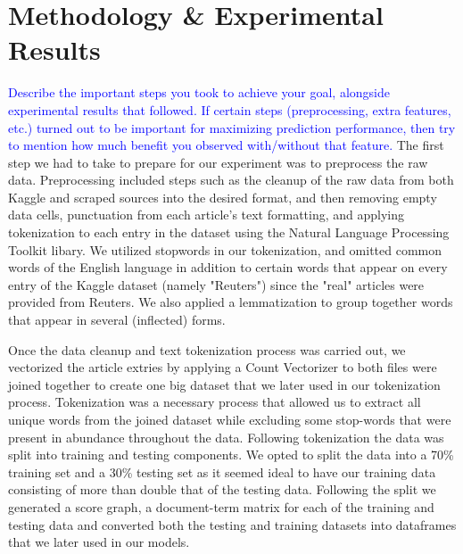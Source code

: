 \documentclass[10pt,twocolumn,letterpaper]{article}
\begin{document}
\section{Methodology \& Experimental Results}

\textcolor{blue}{Describe the important steps you took to achieve your goal, alongside experimental results that followed. If certain steps (preprocessing, extra features, etc.) turned out to be important for maximizing prediction performance, then try to mention how much benefit you observed with/without that feature.}
The first step we had to take to prepare for our experiment was to preprocess the raw data. Preprocessing included steps such as the cleanup of the raw data from both Kaggle and scraped sources into the desired format, and then removing empty data cells, punctuation from each article's text formatting, and applying tokenization to each entry in the dataset using the Natural Language Processing Toolkit libary. We utilized stopwords in our tokenization, and omitted common words of the English language in addition to certain words that appear on every entry of the Kaggle dataset (namely "Reuters") since the "real" articles were provided from Reuters.
We also applied a lemmatization to group together words that appear in several (inflected) forms. \par
Once the data cleanup and text tokenization process was carried out, we vectorized the article extries by applying a Count Vectorizer to  both files were joined together to create one big dataset that we later used in our tokenization process. Tokenization was a necessary process that allowed us to extract all unique words from the joined dataset while excluding some stop-words that were present in abundance throughout the data. Following tokenization the data was split into training and testing components. We opted to split the data into a 70\% training set and a 30\% testing set as it seemed ideal to have our training data consisting of more than double that of the testing data. Following the split we generated a score graph, a document-term matrix for each of the training and testing data and converted both the testing and training datasets into dataframes that we later used in our models. \\
\end{document}
